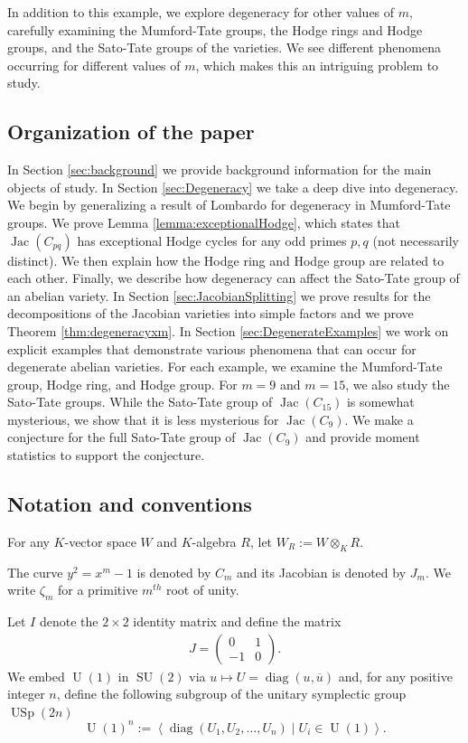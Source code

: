 \documentclass[reqno, oneside, 12pt]{amsart}
\DeclareMathOperator{\Jac}{Jac}
\DeclareMathOperator{\USp}{USp}
\DeclareMathOperator{\SU}{SU}
\DeclareMathOperator{\U}{U}
\DeclareMathOperator{\diag}{diag}
\theoremstyle{remark}
\numberwithin{equation}{section}
\begin{document}
In addition to this example, we explore degeneracy for other values of $m$, carefully examining the Mumford-Tate groups, the Hodge rings and Hodge groups, and the Sato-Tate groups of the varieties. We see different phenomena occurring for different values of $m$, which makes this an intriguing problem to study. 


\subsection*{Organization of the paper}

In Section \ref{sec:background} we provide background information for the main objects of study. 
In Section \ref{sec:Degeneracy} we take a deep dive into degeneracy. We begin by generalizing a result of Lombardo \cite{Lombardo2021} for degeneracy in Mumford-Tate groups. We prove Lemma \ref{lemma:exceptionalHodge}, which states that $\Jac(C_{pq})$ has exceptional Hodge cycles for any odd primes $p,q$ (not necessarily distinct). We then explain how the Hodge ring and Hodge group are related to each other. Finally, we describe how degeneracy can affect the Sato-Tate group of an abelian variety.
In Section \ref{sec:JacobianSplitting} we prove results for the decompositions of the Jacobian varieties into simple factors and we prove Theorem \ref{thm:degeneracyxm}.
In Section \ref{sec:DegenerateExamples} we work on explicit examples that demonstrate various phenomena that can occur for degenerate abelian varieties. For each example, we examine the Mumford-Tate group, Hodge ring, and Hodge group. For $m=9$ and $m=15$, we also study the Sato-Tate groups. While the Sato-Tate group of $\Jac(C_{15})$ is somewhat mysterious, we show that it is less mysterious for $\Jac(C_{9})$. We make a conjecture for the full Sato-Tate group of $\Jac(C_{9})$ and provide moment statistics to support the conjecture.





\subsection*{Notation and conventions}
For any $K$-vector space $W$ and $K$-algebra $R$, let $W_R:=W\otimes_K R.$


The curve $y^2=x^m-1$ is denoted by $C_{m}$ and its Jacobian is denoted by $J_m$. We  write $\zeta_m$ for a primitive $m^{th}$ root of unity. 

Let $I$ denote the $2\times 2$ identity matrix and define the matrix
\begin{align*}
    J=\begin{pmatrix}0&1\\-1&0\end{pmatrix}.
\end{align*}
We embed $\U(1)$ in $\SU(2)$ via $u\mapsto U= \diag(u, \overline u)$ 
and, for any positive integer $n$,  define the following subgroup of the unitary symplectic group $\USp(2n)$
\begin{equation*}\label{eqn:U1n}
    \U(1)^n:=\left\langle \diag( U_1, U_2,\ldots, U_n)\;|\; U_i\in \U(1)\right\rangle.
\end{equation*}
\end{document}
